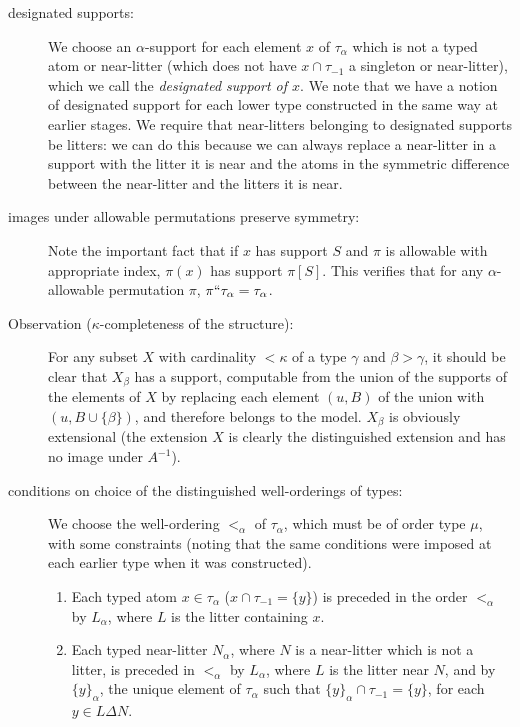 \documentclass[112pt]{article}
\begin{document}
\begin{description}
\item[designated supports:]  We choose an $\alpha$-support for each element $x$ of $\tau_\alpha$ which is not a typed atom or near-litter (which does not have $x \cap \tau_{-1}$ a singleton or near-litter), which we call the {\em designated support of $x$\/}.  We note that we have a notion of designated support for each lower type constructed in the same way at earlier stages.   We require that near-litters belonging to designated supports be litters:  we can do this because we can always replace a near-litter in a support with the litter it is near and the atoms in the symmetric difference between the near-litter and the litters it is near.

\item[images under allowable permutations preserve symmetry:]  Note the important fact that if $x$ has support $S$ and $\pi$ is allowable with appropriate index, $\pi(x)$ has support $\pi[S]$.  This verifies that for any $\alpha$-allowable permutation $\pi$, $\pi``\tau_\alpha = \tau_\alpha$.

\item[Observation ($\kappa$-completeness of the structure):]  For any subset $X$ with cardinality $<\kappa$ of a type $\gamma$ and $\beta>\gamma$, it should be clear that $X_\beta$ has a support, computable from the union of the supports of the elements of $X$  by replacing each element $(u,B)$ of the union with $(u,B \cup \{\beta\})$, and therefore belongs to the model.  $X_\beta$ is obviously extensional (the extension $X$ is clearly the distinguished extension and has no image under $A^{-1}$).

\item[conditions on choice of the distinguished well-orderings of types:]  We choose the well-ordering $<_\alpha$ of $\tau_\alpha$, which must be of order type $\mu$, with some constraints (noting that the same conditions were imposed at each earlier type when it was constructed).

\begin{enumerate}

\item Each typed atom $x \in \tau_\alpha$ ($x \cap \tau_{-1} = \{y\}$) is preceded in the order $<_\alpha$ by $L_\alpha$, where $L$ is the litter containing $x$.

\item Each typed near-litter $N_\alpha$, where $N$ is a near-litter which is not a litter, is preceded in $<_\alpha$ by $L_\alpha$, where $L$ is the litter near $N$,
and by $\{y\}_\alpha$, the unique element of $\tau_\alpha$ such that $\{y\}_\alpha \cap \tau_{-1} = \{y\}$, for each $y \in L \Delta N$.


\end{enumerate}
\end{description}
\end{document}
